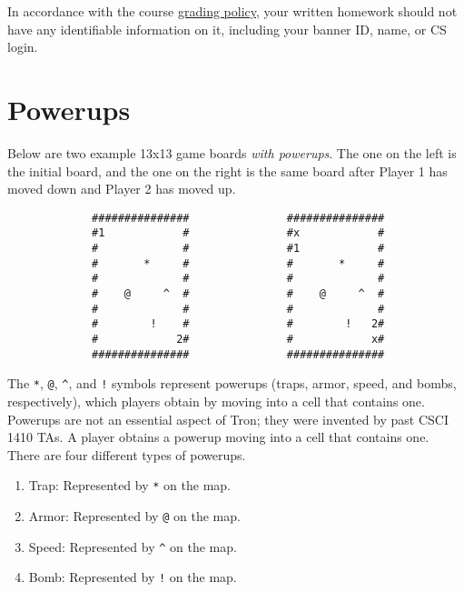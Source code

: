 \documentclass{article}
\begin{document}
In accordance with the course \href {https://cs1410-website.vercel.app/files/Collaboration_Policy.pdf}{grading policy},
your written homework should not have any identifiable information on it,
including your banner ID, name, or CS login.

\nocite{lanctot13}
\nocite{teuling12}
\nocite{samothrakis10}





\appendix

\section{Powerups}
\label{app:powerups}
Below are two example 13x13 game boards \emph{with powerups}.  The one
on the left is the initial board, and the one on the right is the same
board after Player 1 has moved down and Player 2 has moved up.

\begin{verbatim}
             ###############               ###############
             #1            #               #x            #
             #             #               #1            #
             #       *     #               #       *     #
             #             #               #             #
             #    @     ^  #               #    @     ^  #
             #             #               #             #
             #        !    #               #        !   2#
             #            2#               #            x#
             ###############               ###############
\end{verbatim}

The \verb|*|, \verb|@|, \verb|^|, and \verb|!| symbols represent
powerups (traps, armor, speed, and bombs, respectively), which
players obtain by moving into a cell that contains one.
Powerups are not an essential aspect of Tron;
they were invented by past CSCI 1410 TAs.
%
A player obtains a powerup moving into a cell that contains one.
There are four different types of powerups.

\begin{enumerate}
\item Trap: Represented by \texttt{*} on the map.

\item Armor: Represented by \texttt{@} on the map.

\item Speed: Represented by \texttt{\^} on the map.

\item Bomb: Represented by \texttt{!} on the map.
\end{enumerate}
\fi
\end{document}

